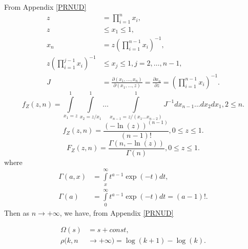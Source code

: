 \documentclass[titlepage,fleqn]{article}%
\begin{document}
\label{PnNfUD}%


From Appendix
\ref{PRNUD}%
\begin{align*}
z  &  =%
{\displaystyle\prod\limits_{i=1}^{n}}
x_{i},\\
z  &  \leq x_{1}\leq1,\\
x_{n}  &  =z\left(
{\displaystyle\prod\limits_{i=1}^{n-1}}
x_{i}\right)  ^{-1},\\
z\left(
{\displaystyle\prod\limits_{i=1}^{j-1}}
x_{i}\right)  ^{-1}  &  \leq x_{j}\leq1,j=2,\ldots,n-1,\\
J  &  =\frac{\partial(x_{1},\ldots,x_{n})}{\partial(x_{1},\ldots,z)}%
=\frac{\partial x_{n}}{\partial z}=\left(
{\displaystyle\prod\limits_{i=1}^{n-1}}
x_{i}\right)  ^{-1}.
\end{align*}%
\[
f_{Z}(z,n)=%
{\displaystyle\int\limits_{x_{1}=z}^{1}}
{\displaystyle\int\limits_{x_{2}=z/x_{1}}^{1}}
\ldots%
{\displaystyle\int\limits_{x_{n-1}=z/\left(  x_{1}\ldots x_{n-2}\right)  }%
^{1}}
J^{-1}dx_{n-1}\ldots dx_{2}dx_{1},2\leq n.
\]%
\[
f_{Z}(z,n)=\frac{(-\ln(z))^{(n-1)}}{(n-1)!},0\leq z\leq1.
\]%
\[
F_{Z}(z,n)=\frac{\Gamma(n,-\ln(z))}{\Gamma(n)},0\leq z\leq1.
\]
where%
\begin{align*}
\Gamma(a,x)  &  =%
{\displaystyle\int\limits_{x}^{\infty}}
t^{a-1}\exp(-t)dt,\\
\Gamma(a)  &  =%
{\displaystyle\int\limits_{0}^{\infty}}
t^{a-1}\exp(-t)dt=(a-1)!.
\end{align*}
Then as $n\rightarrow+\infty$, we have, from Appendix
\ref{PRNUD}%
%

\begin{align*}
\Omega\left(  s\right)   &  =s+const,\\
\rho(k,n  &  \rightarrow+\infty)=\log(k+1)-\log(k).
\end{align*}
\end{document}
